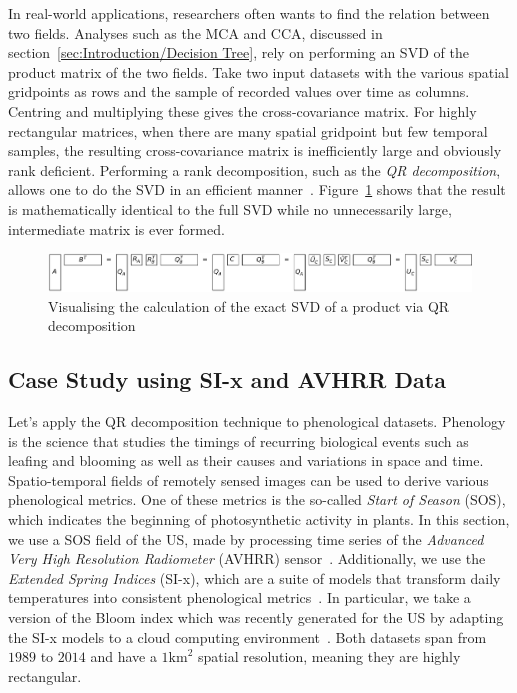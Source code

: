 \documentclass[ijgi,article,submit,moreauthors,pdftex,10pt,a4paper]{Definitions/mdpi}
\begin{document}
In real-world applications, researchers often wants to find the relation between two fields. Analyses such as the MCA and CCA, discussed in section~\ref{sec:Introduction/Decision Tree}, rely on performing an SVD of the product matrix of the two fields. Take two input datasets with the various spatial gridpoints as rows and the sample of recorded values over time as columns. Centring and multiplying these gives the cross-covariance matrix. For highly rectangular matrices, when there are many spatial gridpoint but few temporal samples, the resulting cross-covariance matrix is inefficiently large and obviously rank deficient. Performing a rank decomposition, such as the \textit{QR decomposition}, allows one to do the SVD in an efficient manner~\cite{Chan1982, Tygert2017}. Figure~\ref{fig:qrProductSVD} shows that the result is mathematically identical to the full SVD while no unnecessarily large, intermediate matrix is ever formed.

\begin{figure}[H]
\centering
\includegraphics[width=\textwidth]{Results/qrProductSVD.pdf}
\caption[Exact SVD via QR decomposition]{Visualising the calculation of the exact SVD of a product via QR decomposition}
\label{fig:qrProductSVD}
\end{figure}

\subsection{Case Study using SI-x and AVHRR Data}
\label{sec:Results/Case Study using SI-x and AVHRR Data}

Let's apply the QR decomposition technique to phenological datasets. Phenology is the science that studies the timings of recurring biological events such as leafing and blooming as well as their causes and variations in space and time. Spatio-temporal fields of remotely sensed images can be used to derive various phenological metrics. One of these metrics is the so-called \textit{Start of Season} (SOS), which indicates the beginning of photosynthetic activity in plants. In this section, we use a SOS field of the US, made by processing time series of the \textit{Advanced Very High Resolution Radiometer} (AVHRR) sensor~\cite{Reed1994}. Additionally, we use the \textit{Extended Spring Indices} (SI-x), which are a suite of models that transform daily temperatures into consistent phenological metrics~\cite{Schwartz2013}. In particular, we take a version of the Bloom index which was recently generated for the US by adapting the SI-x models to a cloud computing environment~\cite{Izquierdo2015}. Both datasets span from $1989$ to $2014$ and have a $1\text{km}^2$ spatial resolution, meaning they are highly rectangular.
\end{document}
